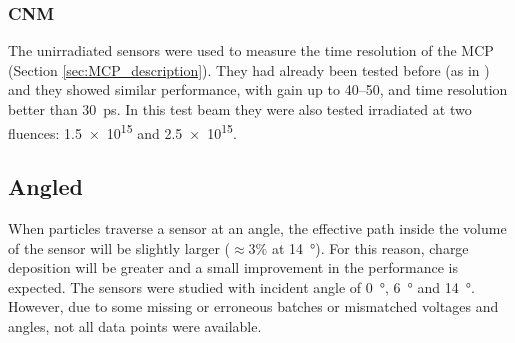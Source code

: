 \subsubsection{CNM}

The unirradiated sensors were used to measure the time resolution of the MCP (Section \ref{sec:MCP_description}). They had already been tested before (as in \cite{Allaire:2018bof}) and they showed similar performance, with gain up to \qtyrange{40}{50}{}, and time resolution better than \qty{30}{\pico\second}. In this test beam they were also tested irradiated at two fluences: \qty{1.5e15}{\neutroneq} and \qty{2.5e15}{\neutroneq}.

\begin{figure}[h!tbp]
    \centering
    \hfill
    \vfill
    \begin{minipage}[c]{.47\linewidth}
    \end{minipage}
    \hfill
    \begin{minipage}[c]{.5\linewidth}
\end{minipage}
\end{figure}


\subsection{Angled}

When particles traverse a sensor at an angle, the effective path inside the volume of the sensor will be slightly larger (\(\approx3\%\) at \qty{14}{\degree}). For this reason, charge deposition will be greater and a small improvement in the performance is expected.
The sensors were studied with incident angle of \qty{0}{\degree}, \qty{6}{\degree} and \qty{14}{\degree}. However, due to some missing or erroneous batches or mismatched voltages and angles, not all data points were available.

